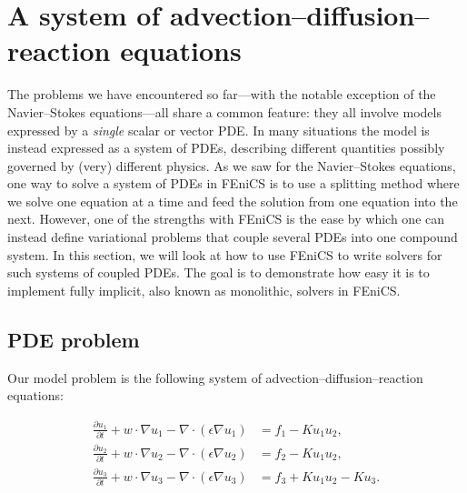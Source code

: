 \documentclass[graybox,envcountchap,sectrefs,final]{svmonodo}
\begin{document}



\section{A system of advection--diffusion--reaction equations}
\label{ftut1:reactionsystem}


The problems we have encountered so far---with the notable exception
of the Navier--Stokes equations---all share a common feature: they all
involve models expressed by a \emph{single} scalar or vector PDE. In many
situations the model is instead expressed as a system of PDEs,
describing different quantities possibly governed by (very) different
physics. As we saw for the Navier--Stokes equations, one way to solve
a system of PDEs in FEniCS is to use a splitting method where we solve
one equation at a time and feed the solution from one equation into
the next. However, one of the strengths with FEniCS is the ease by
which one can instead define variational problems that couple several
PDEs into one compound system. In this section, we will look at how to use
FEniCS to write solvers for such systems of coupled PDEs.
The goal is to demonstrate how easy it is to implement fully implicit,
also known as monolithic, solvers in FEniCS.


\subsection{PDE problem}

Our model problem is the following system of
advection--diffusion--reaction equations:

\begin{align}
  \label{ftut1:reactionsystem:system:1}
  \frac{\partial u_1}{\partial t} +
  w \cdot \nabla u_1 - \nabla\cdot(\epsilon\nabla u_1)
    &= f_1 -K u_1 u_2, \\
  \label{ftut1:reactionsystem:system:2}
  \frac{\partial u_2}{\partial t} +
  w \cdot \nabla u_2 - \nabla\cdot(\epsilon\nabla u_2)
    &= f_2 -K u_1 u_2, \\
  \label{ftut1:reactionsystem:system:3}
  \frac{\partial u_3}{\partial t} +
  w \cdot \nabla u_3 - \nabla\cdot(\epsilon\nabla u_3)
    &= f_3 + K u_1 u_2 - K u_3.
\end{align}
\end{document}
